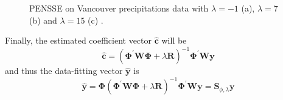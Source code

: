 \begin{figure}
    \centering
    \caption[PENSSE with different $\lambda$]{PENSSE on Vancouver precipitations data with $\lambda=-1$ (a), $\lambda=7$ (b) and $\lambda=15$ (c) \cite{ramsay_functional_2009}.}
    \label{fig:lambda}
\end{figure}
Finally, the estimated coefficient vector $\hat{\mathbf{c}}$ will be 
\begin{equation}
    \hat{\mathbf{c}}=\left(\boldsymbol{\Phi}^{\prime} \mathbf{W} \boldsymbol{\Phi}+\lambda \mathbf{R}\right)^{-1} \boldsymbol{\Phi}^{\prime} \mathbf{W} \mathbf{y}
\end{equation}
and thus the data-fitting vector $\mathbf{\hat{y}}$ is
\begin{equation}
    \label{eq:fittingvector}
    \hat{\mathbf{y}}=\boldsymbol{\Phi}\left(\boldsymbol{\Phi}^{\prime} \mathbf{W} \boldsymbol{\Phi}+\lambda \mathbf{R}\right)^{-1} \boldsymbol{\Phi}^{\prime} \mathbf{W} \mathbf{y}=\mathbf{S}_{\phi, \lambda} \mathbf{y}
\end{equation}

